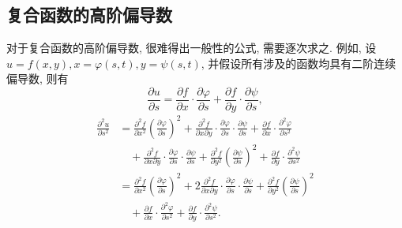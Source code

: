\documentclass[UTF8,12pt,a4paper,fontset=fandol]{ctexart}
\begin{document}
\subsection{复合函数的高阶偏导数}

对于复合函数的高阶偏导数, 很难得出一般性的公式, 需要逐次求之. 例如, 设 $u=f(x,y),x=\varphi(s,t),y=\psi(s,t)$, 并假设所有涉及的函数均具有二阶连续偏导数, 则有
\[
  \frac{\partial u}{\partial s}
  =\frac{\partial f}{\partial x}\cdot\frac{\partial\varphi}{\partial s}
  +\frac{\partial f}{\partial y}\cdot\frac{\partial\psi}{\partial s},
\]
\[
\begin{aligned}
  \frac{\partial^2u}{\partial s^2}
  &=\frac{\partial^2 f}{\partial x^2}\left(\frac{\partial\varphi}{\partial s}\right)^2
  +\frac{\partial^2 f}{\partial x\partial y}\cdot
  \frac{\partial\varphi}{\partial s}\cdot\frac{\partial\psi}{\partial s}
  +\frac{\partial f}{\partial x}\cdot\frac{\partial^2\varphi}{\partial s^2}\\
  &\quad+\frac{\partial^2 f}{\partial x\partial y}\cdot
  \frac{\partial\varphi}{\partial s}\cdot\frac{\partial\psi}{\partial s}
  +\frac{\partial^2 f}{\partial y^2}\left(\frac{\partial\psi}{\partial s}\right)^2
  +\frac{\partial f}{\partial y}\cdot\frac{\partial^2\psi}{\partial s^2}\\
  &=\frac{\partial^2 f}{\partial x^2}\left(\frac{\partial\varphi}{\partial s}\right)^2
  +2\frac{\partial^2 f}{\partial x\partial y}\cdot
  \frac{\partial\varphi}{\partial s}\cdot\frac{\partial\psi}{\partial s}
  +\frac{\partial^2 f}{\partial y^2}\left(\frac{\partial\psi}{\partial s}\right)^2\\
  &\quad+\frac{\partial f}{\partial x}\cdot\frac{\partial^2\varphi}{\partial s^2}
  +\frac{\partial f}{\partial y}\cdot\frac{\partial^2\psi}{\partial s^2}.
\end{aligned}
\]
\end{document}
